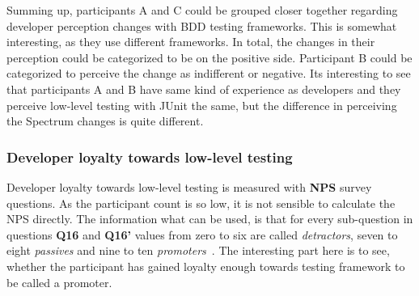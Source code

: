 Summing up, participants A and C could be grouped closer together regarding developer perception changes with BDD testing
frameworks. This is somewhat interesting, as they use different frameworks. In total, the changes in their perception could be categorized
to be on the positive side. Participant B could be categorized to perceive the change as indifferent or negative. Its interesting
to see that participants A and B have same kind of experience as developers and they perceive low-level testing with JUnit the same,
but the difference in perceiving the Spectrum changes is quite different.


\subsubsection{Developer loyalty towards low-level testing}
Developer loyalty towards low-level testing is measured with \textbf{NPS} survey questions. As the participant count is so low, it is not
sensible to calculate the NPS directly. The information what can be used, is that for every sub-question in questions
\textbf{Q16} and \textbf{Q16'} values from zero to six are called \textit{detractors}, seven to eight \textit{passives} and
nine to ten \textit{promoters}~\cite{reichheld2003one}. The interesting part here is to see, whether the participant has gained loyalty enough
towards testing framework to be called a promoter.

